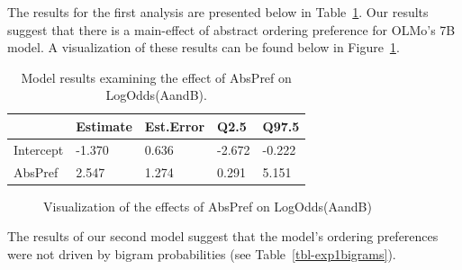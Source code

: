 \documentclass[
  12pt,
  letterpaper,
]{scrreprt}
\begin{document}
The results for the first analysis are presented below in
Table~\ref{tbl-exp1m1}. Our results suggest that there is a main-effect
of abstract ordering preference for OLMo's 7B model. A visualization of
these results can be found below in Figure~\ref{fig-exp1m1}.

\begin{longtable}[]{@{}lllll@{}}

\caption{\label{tbl-exp1m1}Model results examining the effect of AbsPref
on LogOdds(AandB).}

\tabularnewline

\toprule\noalign{}
& Estimate & Est.Error & Q2.5 & Q97.5 \\
\midrule\noalign{}
\endhead
\bottomrule\noalign{}
\endlastfoot
Intercept & -1.370 & 0.636 & -2.672 & -0.222 \\
AbsPref & 2.547 & 1.274 & 0.291 & 5.151 \\

\end{longtable}

\begin{figure}[htbp]

\caption{\label{fig-exp1m1}Visualization of the effects of AbsPref on
LogOdds(AandB)}


\end{figure}%

The results of our second model suggest that the model's ordering
preferences were not driven by bigram probabilities (see
Table~\ref{tbl-exp1bigrams}).
\end{document}
